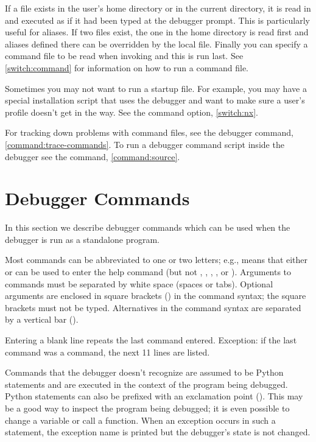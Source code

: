 If a file 
 exists
in the user's home directory or in the current directory, it is read
in and executed as if it had been typed at the debugger prompt.  This
is particularly useful for aliases.  If two files exist, the one in
the home directory is read first and aliases defined there can be
overridden by the local file. Finally you can specify a command file
to be read when invoking  and this is run last. See
\ref{switch:command} for information on how to run a command file.

Sometimes you may not want to run a startup file. For example,
you may have a special installation script that uses the debugger and
want to make sure a user's profile doesn't get in the way. See
the  command option, \ref{switch:nx}.

For tracking down problems with command files, see the  debugger command, \ref{command:trace-commands}. To run a
debugger command script inside the debugger see the 
command, \ref{command:source}.

\section{Debugger Commands\label{pydb-commands}}

In this section we describe debugger commands which can be used when
the debugger is run as a standalone program.

Most commands can be abbreviated to one or two letters;
e.g.,  means that either  or  can be
used to enter the help command (but not , ,
, , or ).  Arguments to commands must
be separated by white space (spaces or tabs).  Optional arguments are
enclosed in square brackets (\samp{[]}) in the command syntax; the
square brackets must not be typed.  Alternatives in the command syntax
are separated by a vertical bar (\samp{|}).

Entering a blank line repeats the last command entered.  Exception: if
the last command was a  command, the next 11 lines are
listed.

Commands that the debugger doesn't recognize are assumed to be Python
statements and are executed in the context of the program being
debugged.  Python statements can also be prefixed with an exclamation
point (\samp{!}).  This may be a good way to inspect the program being
debugged; it is even possible to change a variable or call a function.
When an exception occurs in such a statement, the exception name is
printed but the debugger's state is not changed.

